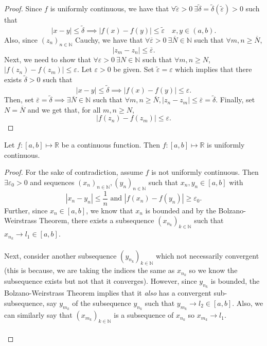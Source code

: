 \documentclass{article}
\newcommand{\R}{\mathbb{R}}
\newcommand{\N}{\mathbb{N}}
\newcommand{\seq}[2]{(#1_{#2})_{#2 \in \N}}
\newcommand{\sseq}[3]{(#1_{#2_#3})_{#3 \in \N}}
\newcommand{\?}{\stackrel{?}{=}}
\theoremstyle{definition} %
\begin{document}
\begin{itemize}
\begin{proposition}
              \label{prop:unif_cont_cauchy}
          \end{proposition}
          \begin{proof}
              Since $f$ is uniformly continuous, we have that $\forall \widetilde{\varepsilon} > 0 \ \exists \widetilde{\delta} = \widetilde{\delta}(\widetilde{\varepsilon}) > 0$ such that
              $$|x - y| \leq \widetilde{\delta} \implies |f(x) - f(y)| \leq \widetilde{\varepsilon} \quad x, y \in (a, b).$$ Also, since $\seq{z}{n}$ Cauchy, we have that $\forall \overline{\varepsilon} > 0 \ \exists \overline{N} \in \N$ such that $\forall m, n \geq \overline{N}$,
              $$|z_m - z_n| \leq \overline{\varepsilon}.$$
              Next, we need to show that $\forall \varepsilon > 0 \ \exists N \in \N$ such that $\forall m, n \geq N$, $|f(z_n) - f(z_m)| \leq \varepsilon$. Let $\varepsilon > 0$ be given. Set $\widetilde{\varepsilon} = \varepsilon$ which implies that there exists $\widetilde{\delta} > 0$ such that
              $$|x - y| \leq \widetilde{\delta} \implies |f(x) - f(y)| \leq \varepsilon.$$
              Then, set $\overline{\varepsilon} = \widetilde{\delta} \implies \exists \overline{N} \in \N$ such that $\forall m, n \geq \overline{N}, |z_n - z_m| \leq \overline{\varepsilon} = \widetilde{\delta}$. Finally, set $N = \overline{N}$ and we get that, for all $m, n \geq N$,
              $$|f(z_n) - f(z_m)| \leq \varepsilon.$$
          \end{proof}
          \begin{theorem}
              Let $f: [a, b] \mapsto \R$ be a continuous function. Then $f: [a, b] \mapsto \R$ is uniformly continuous.
              \label{theorem:unif_cont}
          \end{theorem}
          \begin{proof}
              For the sake of contradiction, assume $f$ is not uniformly continuous. Then $\exists \varepsilon_0 > 0$ and sequences $\seq{x}{n}, \seq{y}{n}$ such that $x_n, y_n \in [a, b]$ with
              $$|x_n - y_n| \leq \frac{1}{n} \text{ and } |f(x_n) - f(y_n)| \geq \varepsilon_0.$$
              Further, since $x_n \in [a, b]$, we know that $x_n$ is bounded and by the Bolzano-Weirstrass Theorem, there exists a subsequence $\sseq{x}{n}{k}$ such that $x_{n_k} \rightarrow l_1 \in [a, b]$. \\\\
              Next, consider another subsequence $\sseq{y}{n}{k}$ which not necessarily convergent (this is because, we are taking the indices the same as $x_{n_k}$ so we know the subsequence exists but not that it converges). However, since $y_{n_k}$ is bounded, the Bolzano-Weirstrass Theorem implies that it \textit{also} has a convergent sub-subsequence, say $y_{m_k}$ of the subsequence $y_{n_k}$ such that $y_{m_k} \rightarrow l_2 \in [a, b]$. Also, we can similarly say that $\sseq{x}{m}{k}$ is a subsequence of $x_{n_k}$ so $x_{m_k} \rightarrow l_1$. \\\\

\end{proof}
\end{itemize}
\end{document}
